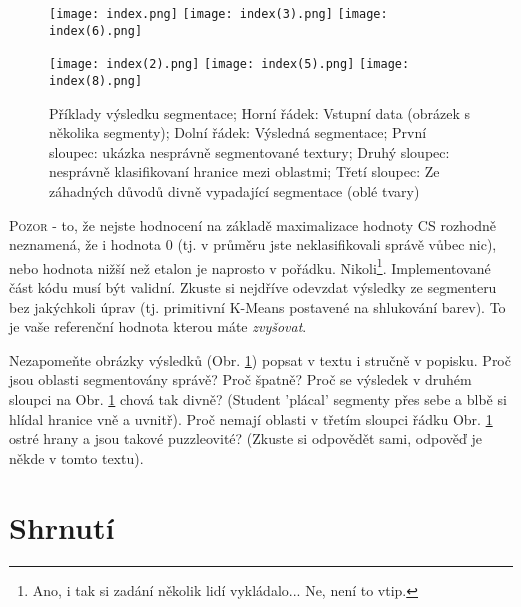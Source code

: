 \documentclass[a4paper,10pt,twocolumn]{article}
\begin{document}
\begin{figure}[H]
      \begin{center}
            \texttt{[image: index.png]}
            \texttt{[image: index(3).png]}
            \texttt{[image: index(6).png]}

            \vspace{1mm}	

            \texttt{[image: index(2).png]}
            \texttt{[image: index(5).png]}
            \texttt{[image: index(8).png]}
      \end{center}
      \caption{Příklady výsledku segmentace; Horní řádek: Vstupní data (obrázek s několika segmenty); Dolní řádek: Výsledná segmentace; První sloupec: ukázka nesprávně segmentované textury; Druhý sloupec: nesprávně klasifikovaní hranice mezi oblastmi; Třetí sloupec: Ze záhadných důvodů divně vypadající segmentace (oblé tvary)}
\label{fig1}
\end{figure}

\textsc{Pozor} -  to, že nejste hodnocení na základě maximalizace hodnoty CS rozhodně neznamená, že i hodnota 0 (tj. v průměru jste neklasifikovali správě vůbec nic), nebo hodnota nižší než etalon je naprosto v pořádku. Nikoli\footnote{Ano, i tak si zadání několik lidí vykládalo... Ne, není to vtip.}. Implementované část kódu musí být validní. Zkuste si nejdříve odevzdat výsledky ze segmenteru bez jakýchkoli úprav (tj. primitivní K-Means postavené na shlukování barev). To je vaše referenční hodnota kterou máte \emph{zvyšovat}. %

Nezapomeňte obrázky výsledků (Obr. \ref{fig1}) popsat v textu i stručně v popisku. Proč jsou oblasti segmentovány správě? Proč špatně? Proč se výsledek v druhém sloupci na Obr. \ref{fig1} chová tak divně? (Student 'plácal' segmenty přes sebe a blbě si hlídal hranice vně a uvnitř). Proč nemají oblasti v třetím sloupci řádku Obr. \ref{fig1} ostré hrany a jsou takové puzzleovité? (Zkuste si odpovědět sami, odpověď je někde v tomto textu). 



%
\section{Shrnutí}
\end{document}

